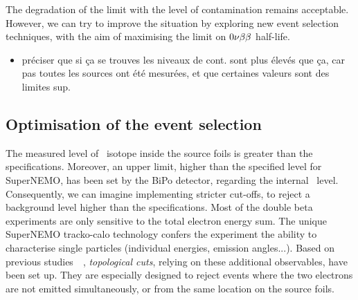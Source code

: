 The degradation of the limit with the level of contamination remains acceptable.
However, we can try to improve the situation by exploring new event selection techniques, with the aim of maximising the limit on $0\nu\beta\beta$ half-life.

\begin{itemize}
\item préciser que si ça se trouves les niveaux de cont. sont plus élevés que ça, car pas toutes les sources ont été mesurées, et que certaines valeurs sont des limites sup.
\end{itemize}

\subsection{Optimisation of the event selection}
\label{subsec:opti_ev_selection}

The measured level of \Tl\ isotope inside the source foils is greater than the specifications.
Moreover, an upper limit, higher than the specified level for SuperNEMO, has been set by the BiPo detector, regarding the internal \Bi\ level.
Consequently, we can imagine implementing stricter cut-offs, to reject a background level higher than the specifications.
Most of the double beta experiments are only sensitive to the total electron energy sum.
The unique SuperNEMO tracko-calo technology confers the experiment the ability to characterise single particles (individual energies, emission angles...).
Based on previous studies~\cite{CalvezThesis}~\cite{ChaponThesis}, \emph{topological cuts}, relying on these additional observables, have been set up.
They are especially designed to reject events where the two electrons are not emitted simultaneously, or from the same location on the source foils.

